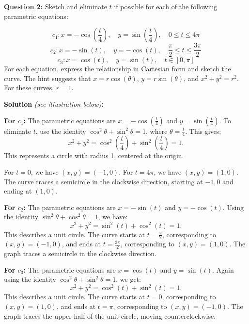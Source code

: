 \documentclass{article}
\begin{document}
\begin{exercisebox}
\textbf{Question 2:} Sketch and eliminate \( t \) if possible for each of the following parametric equations:

\[
    c_1: x = -\cos\left(\frac{t}{4}\right), \quad y = \sin\left(\frac{t}{4}\right), \quad 0 \leq t \leq 4\pi
\]
\[
    c_2: x = -\sin(t), \quad y = -\cos(t), \quad \frac{\pi}{2} \leq t \leq \frac{3\pi}{2}
\]
\[
    c_3: x = \cos(t), \quad y = \sin(t), \quad t \in [0, \pi]
\]
For each equation, express the relationship in Cartesian form and sketch the curve. The hint suggests that \( x = r \cos(\theta) \), \( y = r \sin(\theta) \), and \( x^2 + y^2 = r^2 \). For these curves, \( r = 1 \).

\begin{solutionbox}
    \textbf{Solution} \textit{(see illustration below)}\textbf{:}
    
    \textbf{For \( c_1 \):}
    The parametric equations are \( x = -\cos\left(\frac{t}{4}\right) \) and \( y = \sin\left(\frac{t}{4}\right) \). To eliminate \( t \), use the identity \( \cos^2\theta + \sin^2\theta = 1 \), where \( \theta = \frac{t}{4} \). This gives:
    \[
        x^2 + y^2 = \cos^2\left(\frac{t}{4}\right) + \sin^2\left(\frac{t}{4}\right) = 1.
    \]
    This represents a circle with radius 1, centered at the origin.
    
    For \( t = 0 \), we have \( (x, y) = (-1, 0) \). For \( t = 4\pi \), we have \( (x, y) = (1, 0) \). The curve traces a semicircle in the clockwise direction, starting at \( -1, 0 \) and ending at \( (1, 0) \).
    
    \textbf{For \( c_2 \):}
    The parametric equations are \( x = -\sin(t) \) and \( y = -\cos(t) \). Using the identity \( \sin^2\theta + \cos^2\theta = 1 \), we have:
    \[
        x^2 + y^2 = \sin^2(t) + \cos^2(t) = 1.
    \]
    This describes a unit circle. The curve starts at \( t = \frac{\pi}{2} \), corresponding to \( (x, y) = (-1, 0) \), and ends at \( t = \frac{3\pi}{2} \), corresponding to \( (x, y) = (1, 0) \). The graph traces a semicircle in the clockwise direction.
    
    \textbf{For \( c_3 \):}
    The parametric equations are \( x = \cos(t) \) and \( y = \sin(t) \). Again using the identity \( \cos^2\theta + \sin^2\theta = 1 \), we get:
    \[
        x^2 + y^2 = \cos^2(t) + \sin^2(t) = 1.
    \]
    This describes a unit circle. The curve starts at \( t = 0 \), corresponding to \( (x, y) = (1, 0) \), and ends at \( t = \pi \), corresponding to \( (x, y) = (-1, 0) \). The graph traces the upper half of the unit circle, moving counterclockwise.
\end{solutionbox}
\end{exercisebox}
\end{document}
